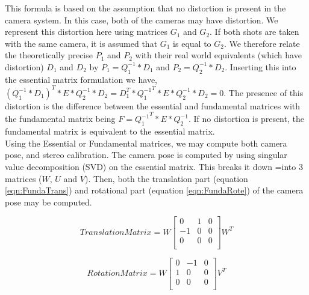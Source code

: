 This formula is based on the assumption that no distortion is present in the camera system. In this case, both of the cameras may have distortion. We represent this distortion here using matrices $G_1$ and $G_2$. If both shots are taken with the same camera, it is assumed that $G_1$ is equal to $G_2$. We therefore relate the theoretically precise $P_1$ and $P_2$ with their real world equivalents (which have distortion) $D_1$ and $D_2$ by $P_1 = Q_1^{-1} * D_1$ and $P_2 = Q_2^{-1} * D_2$. Inserting this into the essential matrix formulation we have, $(Q_1^{-1} * D_1)^T * E * Q_2^{-1} * D_2 = D_{1}^{T} * {Q_1^{-1}}^{T} * E * Q_2^{-1} * D_2 = 0$. The presence of this distortion is the difference between the essential and fundamental matrices with the fundamental matrix being $F = {Q_1^{-1}}^{T} * E * Q_2^{-1}$. If no distortion is present, the fundamental matrix is equivalent to the essential matrix. \\

Using the Essential or Fundamental matrices, we may compute both camera pose, and stereo calibration. The camera pose is computed by using singular value decomposition (SVD) on the essential matrix. This breaks it down =into 3 matrices ($W$, $U$ and $V$). Then, both the translation part (equation \ref{eqn:FundaTrans}) and rotational part (equation \ref{eqn:FundaRote}) of the camera pose may be computed.


\begin{equation} \label{eqn:FundaTrans}
Translation Matrix = W\left[
\begin{array}{ccc}
0 & 1 & 0 \\
-1 & 0 & 0 \\
0 & 0 & 0 \\
\end{array}
\right]W^{T}
\end{equation}

\begin{equation} \label{eqn:FundaRote}
Rotation Matrix = W\left[
\begin{array}{ccc}
0 & -1 & 0 \\
1 & 0 & 0 \\
0 & 0 & 0 \\
\end{array}
\right]V^{T}
\end{equation}

